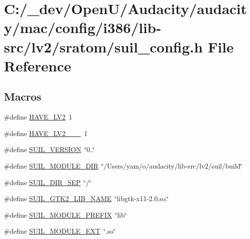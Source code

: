 \hypertarget{mac_2config_2i386_2lib-src_2lv2_2sratom_2suil__config_8h}{}\section{C\+:/\+\_\+dev/\+Open\+U/\+Audacity/audacity/mac/config/i386/lib-\/src/lv2/sratom/suil\+\_\+config.h File Reference}
\label{mac_2config_2i386_2lib-src_2lv2_2sratom_2suil__config_8h}
\subsection*{Macros}
\begin{DoxyCompactItemize}
\item 
\#define \hyperlink{mac_2config_2i386_2lib-src_2lv2_2sratom_2suil__config_8h_a3377686d402043f36819f446ef0e0edd}{H\+A\+V\+E\+\_\+\+L\+V2}~1
\item 
\#define \hyperlink{mac_2config_2i386_2lib-src_2lv2_2sratom_2suil__config_8h_a2da14b31a59e3efae57c0ab8f46c18eb}{H\+A\+V\+E\+\_\+\+L\+V2\+\_\+\_\+\_}~1
\item 
\#define \hyperlink{mac_2config_2i386_2lib-src_2lv2_2sratom_2suil__config_8h_a36ff1ac58c3b45cc6964c38e4b76b4d2}{S\+U\+I\+L\+\_\+\+V\+E\+R\+S\+I\+ON}~\char`\"{}0..\char`\"{}
\item 
\#define \hyperlink{mac_2config_2i386_2lib-src_2lv2_2sratom_2suil__config_8h_a6f34ba79b7d71e94a6dd042abc293619}{S\+U\+I\+L\+\_\+\+M\+O\+D\+U\+L\+E\+\_\+\+D\+IR}~\char`\"{}/Users/yam/o/audacity/lib-\/src/lv2/suil/build\char`\"{}
\item 
\#define \hyperlink{mac_2config_2i386_2lib-src_2lv2_2sratom_2suil__config_8h_a849cee5f74c808afbcbb5160a706d9d0}{S\+U\+I\+L\+\_\+\+D\+I\+R\+\_\+\+S\+EP}~\char`\"{}/\char`\"{}
\item 
\#define \hyperlink{mac_2config_2i386_2lib-src_2lv2_2sratom_2suil__config_8h_a2a4a442c56d9c0a71a94c5394af58c69}{S\+U\+I\+L\+\_\+\+G\+T\+K2\+\_\+\+L\+I\+B\+\_\+\+N\+A\+ME}~\char`\"{}libgtk-\/x11-\/2.\+0.so.\char`\"{}
\item 
\#define \hyperlink{mac_2config_2i386_2lib-src_2lv2_2sratom_2suil__config_8h_a7875042f0685b90513b92bd268baa764}{S\+U\+I\+L\+\_\+\+M\+O\+D\+U\+L\+E\+\_\+\+P\+R\+E\+F\+IX}~\char`\"{}lib\char`\"{}
\item 
\#define \hyperlink{mac_2config_2i386_2lib-src_2lv2_2sratom_2suil__config_8h_a518fd0d3499e315e0f8fb368d4583ad2}{S\+U\+I\+L\+\_\+\+M\+O\+D\+U\+L\+E\+\_\+\+E\+XT}~\char`\"{}.so\char`\"{}
\end{DoxyCompactItemize}


